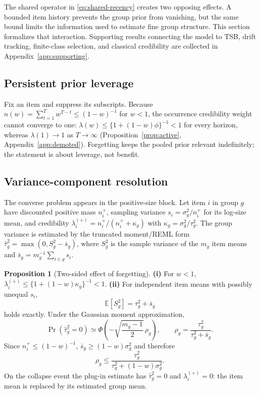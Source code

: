 \documentclass[twoside]{article}
\theoremstyle{definition}
\newtheorem{proposition}{Proposition}
\newcommand{\E}{\mathbb{E}}
\begin{document}
The shared operator in \eqref{eq:shared-recency} creates two opposing
effects. A bounded item history prevents the group prior from vanishing,
but the same bound limits the information used to estimate fine group
structure. This section formalizes that interaction. Supporting results
connecting the model to TSB, drift tracking, finite-class selection, and
classical credibility are collected in Appendix~\ref{app:supporting}.

\subsection{Persistent prior leverage}

Fix an item and suppress its subscripts. Because
$n(w)=\sum_{t=1}^{T}w^{T-t}\le(1-w)^{-1}$ for $w<1$, the occurrence
credibility weight cannot converge to one: $\lambda(w)\le\{1+(1-w)\phi\}^{-1}<1$
for every horizon, whereas $\lambda(1)\to1$ as $T\to\infty$
(Proposition~\ref{prop:active}, Appendix~\ref{app:demoted}). Forgetting
keeps the pooled prior relevant indefinitely; the statement is about
leverage, not benefit.

\subsection{Variance-component resolution}\label{sec:resolution}

The converse problem appears in the positive-size block. Let item $i$
in group $g$ have discounted positive mass $n_i^+$, sampling variance
$s_i=\sigma_g^2/n_i^+$ for its log-size mean, and credibility
$\lambda_i^{(+)}=n_i^+/(n_i^++\kappa_g)$ with
$\kappa_g=\sigma_g^2/\tau_g^2$. The group variance is estimated by the
truncated moment/REML form
$\hat\tau_g^2=\max(0,S_g^2-\bar s_g)$, where $S_g^2$ is the sample
variance of the $m_g$ item means and
$\bar s_g=m_g^{-1}\sum_{i\in g}s_i$.

\begin{proposition}[Two-sided effect of forgetting]
\label{prop:twosided}
\textbf{(i)} For $w<1$,
$\lambda_i^{(+)}\le\{1+(1-w)\kappa_g\}^{-1}<1$.
\textbf{(ii)} For independent item means with possibly unequal $s_i$,
\[
\E[S_g^2]=\tau_g^2+\bar s_g
\]
holds exactly. Under the Gaussian moment approximation,
\begin{equation}
\Pr(\hat\tau_g^2=0)\simeq
\Phi\!\left(-\sqrt{\frac{m_g-1}{2}}\,\rho_g\right),
\qquad
\rho_g=\frac{\tau_g^2}{\tau_g^2+\bar s_g}.
\label{eq:collapse-prob}
\end{equation}
Since $n_i^+\le(1-w)^{-1}$,
$\bar s_g\ge(1-w)\sigma_g^2$ and therefore
\[
\rho_g\le
\frac{\tau_g^2}{\tau_g^2+(1-w)\sigma_g^2}.
\]
On the collapse event the plug-in estimate has $\hat\tau_g^2=0$ and
$\lambda_i^{(+)}=0$: the item mean is replaced by its estimated group
mean.
\end{proposition}
\end{document}
